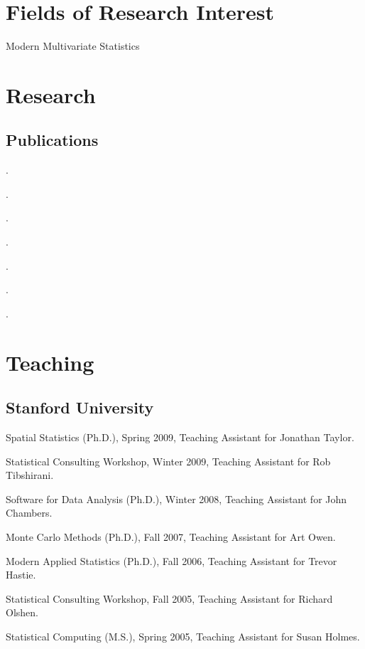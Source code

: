 \documentclass[10pt,letterpaper]{article}
\renewenvironment{itemize}{
  \begin{list}{}{
    \setlength{\leftmargin}{1.5em}
    \setlength{\itemsep}{0.25em}
    \setlength{\parskip}{0pt}
    \setlength{\parsep}{0.25em}
  }
}{
  \end{list}
}
\begin{document}
\section*{Fields of Research Interest}

\begin{itemize}
\item Modern Multivariate Statistics
\end{itemize}


\section*{Research}

\subsection*{Publications}

\begin{itemize}
\item {}.
\item {}.
\item {}.
\item {}.
\item {}.
\item {}.
\item {}.
\end{itemize}



\section*{Teaching}


\subsection*{Stanford University}

\begin{itemize}
\item Spatial Statistics (Ph.D.), Spring 2009, Teaching Assistant for Jonathan Taylor.
\item Statistical Consulting Workshop, Winter 2009, Teaching Assistant for Rob Tibshirani.
\item Software for Data Analysis (Ph.D.), Winter 2008, Teaching Assistant for John Chambers.
\item Monte Carlo Methods (Ph.D.), Fall 2007, Teaching Assistant for Art Owen.
\item Modern Applied Statistics (Ph.D.), Fall 2006, Teaching Assistant for Trevor Hastie.
\item Statistical Consulting Workshop, Fall 2005, Teaching Assistant for Richard Olshen.
\item Statistical Computing (M.S.), Spring 2005, Teaching Assistant for Susan Holmes.
\end{itemize}
\end{document}
